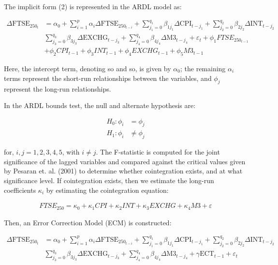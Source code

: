 \documentclass[11pt,a4paper]{article}
\begin{document}
The implicit form (2) is represented in the ARDL model as:

\begin{align*}
    \Delta \text{FTSE}_{250_t} &= \alpha_0 + \sum_{i=1}^{p} \alpha_i \Delta \text{FTSE}_{250_{t-i}} + \sum_{j_{1}=0}^{q_1} \beta_{1j_{1}} \Delta \text{CPI}_{t-j_{1}} + \sum_{j_{2}=0}^{q_2} \beta_{2j_{2}} \Delta \text{INT}_{t-j_{2}} \\
                               & \sum_{j_{3}=0}^{q_3} \beta_{3j_{3}} \Delta \text{EXCHG}_{t-j_{3}} + \sum_{j_{4}=0}^{q_4} \beta_{4j_{4}} \Delta \text{M3}_{t-j_{4}} + \varepsilon_t + \phi_{1} FTSE_{250_{t-1}} \\
                               & + \phi_{2} CPI_{t-1} + \phi_{3} INT_{t-1} +\phi_4 EXCHG_{t-1} + \phi_5 M3_{t-1}
\end{align*}

Here, the intercept term, denoting so and so, is given by $\alpha_0$; the 
remaining $\alpha_i$ terms represent the short-run relationships 
between the variables, and $\phi_j$ represent the long-run relationships. 

In the ARDL bounds test, the null and alternate hypothesis are:
 
\begin{align*}
    H_{0}: \phi_i &= \phi_j\\
    H_{1}: \phi_i &\neq \phi_j
\end{align*}

for, $i,j = 1,2,3,4,5$, with $i\neq j$. The F-statistic is computed for the joint
significance of the lagged variables and compared against the critical values
given by Pesaran et. al. (2001) to determine whether cointegration exists, 
and at what significance level. If cointegration exists, then we estimate 
the long-run coefficients $\kappa_i$ by estimating the cointegration equation:

\begin{align}
    FTSE_{250} = \kappa_0 + \kappa_1 CPI + \kappa_2 INT + \kappa_3 EXCHG + \kappa_4 M3 + \varepsilon 
\end{align}

Then, an Error Correction Model (ECM) is constructed:

\begin{align*}
    \Delta \text{FTSE}_{250_t} &= \alpha_0 + \sum_{i=1}^{p} \alpha_i \Delta \text{FTSE}_{250_{t-i}} + \sum_{j_{1}=0}^{q_1} \beta_{1j_{1}} \Delta \text{CPI}_{t-j_{1}} + \sum_{j_{2}=0}^{q_2} \beta_{2j_{2}} \Delta \text{INT}_{t-j_{2}} \\
                               & \sum_{j_{3}=0}^{q_3} \beta_{3j_{3}} \Delta \text{EXCHG}_{t-j_{3}} + \sum_{j_{4}=0}^{q_4} \beta_{4j_{4}} \Delta \text{M3}_{t-j_{4}} + \gamma\text{ECT}_{t-1} + \varepsilon_t
\end{align*}
\end{document}
